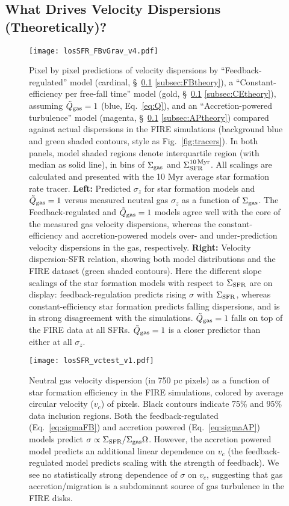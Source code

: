 \documentclass[usletter,fleqn,usenatbib]{mnras}
\begin{document}
\subsection{What Drives Velocity Dispersions (Theoretically)?} \label{subsec:scalings}
\begin{figure*}
	\centering
	\texttt{[image: losSFR\_FBvGrav\_v4.pdf]}
	\caption{Pixel by pixel predictions of velocity dispersions by ``Feedback-regulated'' model (cardinal, \S~\ref{subsec:scalings} \ref{subsec:FBtheory}), a ``Constant-efficiency per free-fall time'' model (gold, \S~\ref{subsec:scalings} \ref{subsec:CEtheory}), assuming $\tilde Q_{\rm gas} =1$ (blue, Eq.~\ref{eq:Q}), and an ``Accretion-powered turbulence'' model (magenta, \S~\ref{subsec:scalings} \ref{subsec:APtheory}) compared against actual dispersions in the FIRE simulations (background blue and green shaded contours, style as Fig.~\ref{fig:tracers}).  In both panels, model shaded regions denote interquartile region (with median as solid line), in bins of $\Sigma_{\rm gas}$ and $\Sigma_{\rm SFR}^{\rm 10 \, Myr}$. All scalings are calculated and presented with the 10 Myr average star formation rate tracer.
	\textbf{Left:}  Predicted $\sigma_z$ for star formation models and $\tilde Q_{\rm gas} =1$ versus measured neutral gas $\sigma_{z}$ as a function of $\Sigma_{\rm gas}$.  The Feedback-regulated and $\tilde Q_{\rm gas} =1$ models agree well with the core of the measured gas velocity dispersions, whereas the constant-efficiency and accretion-powered models over- and under-prediction velocity dispersions in the gas, respectively. 
	\textbf{Right:} Velocity dispersion-SFR relation, showing both model distributions and the FIRE dataset (green shaded contours). Here the different slope scalings of the star formation models with respect to $\Sigma_{\rm SFR}$ are on display: feedback-regulation predicts rising $\sigma$ with $\Sigma_{\rm SFR}$, whereas constant-efficiency star formation predicts falling dispersions, and is in strong disagreement with the simulations. $\tilde Q_{\rm gas} =1$ falls on top of the FIRE data at all SFRs.  $\tilde Q_{\rm gas} =1$ is a closer predictor than either at all $\sigma_z$.}
	\label{fig:FBvG}
\end{figure*}

\begin{figure}
	\centering
	\texttt{[image: losSFR\_vctest\_v1.pdf]}
	\caption{Neutral gas velocity dispersion (in 750 pc pixels) as a function of star formation efficiency in the FIRE simulations, colored by average circular velocity ($v_c$) of pixels.  Black contours indicate 75\% and 95\% data inclusion regions.  Both the feedback-regulated (Eq.~\ref{eq:sigmaFB}) and accretion powered (Eq.~\ref{eq:sigmaAP}) models predict $\sigma \propto \Sigma_{\rm SFR}/\Sigma_{\rm gas}\Omega$.  However, the accretion powered model predicts an additional linear dependence on $v_c$ (the feedback-regulated model predicts scaling with the strength of feedback).  We see no statistically strong dependence of $\sigma$ on $v_c$, suggesting that gas accretion/migration is a subdominant source of gas turbulence in the FIRE disks.}
	\label{fig:vctest}
\end{figure}
\end{document}
